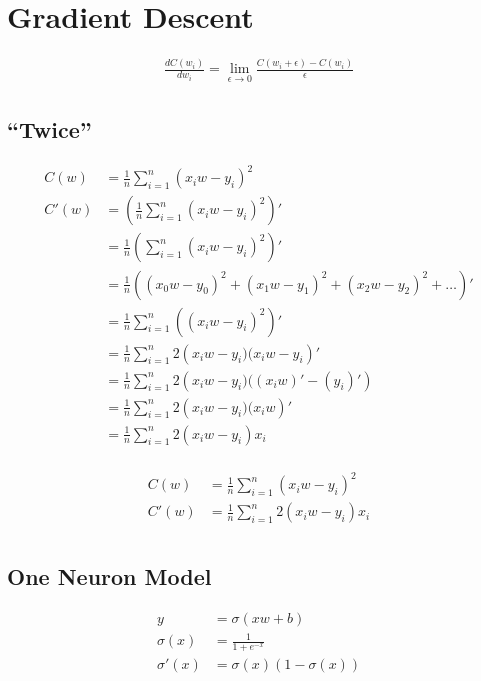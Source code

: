 \documentclass{article}
\begin{document}
\section{Gradient Descent}

\begin{align}
    \frac{dC(w_i)}{dw_i} = \lim_{\epsilon \to 0}\frac{C(w_i + \epsilon) - C(w_i)}{\epsilon}
\end{align}

\subsection{``Twice''}

\begin{align}
    C(w) &= \frac{1}{n} \sum_{i=1}^{n} (x_i w - y_i)^2 \\
    C'(w) 
	&= \left(\frac{1}{n} \sum_{i=1}^{n} (x_i w - y_i)^2\right)' \\
	&= \frac{1}{n}\left(\sum_{i=1}^{n} (x_i w - y_i)^2\right)' \\
	&= \frac{1}{n}\left((x_0 w - y_0)^2 + (x_1 w - y_1)^2 + (x_2 w - y_2)^2 + \hdots \right)' \\
	&= \frac{1}{n}\sum_{i=1}^{n} \left((x_i w - y_i)^2\right)' \\
	&= \frac{1}{n}\sum_{i=1}^{n} 2\left(x_i w - y_i) (x_i w - y_i\right)' \\
	&= \frac{1}{n}\sum_{i=1}^{n} 2\left(x_i w - y_i) ((x_i w)' - (y_i)'\right) \\
	&= \frac{1}{n}\sum_{i=1}^{n} 2\left(x_i w - y_i) (x_i w \right)' \\
	&= \frac{1}{n}\sum_{i=1}^{n} 2\left(x_i w - y_i\right)x_i \\
\end{align}

\begin{align}
	C(w) &= \frac{1}{n} \sum_{i=1}^{n} (x_i w - y_i)^2 \\
	C'(w) &= \frac{1}{n}\sum_{i=1}^{n} 2\left(x_i w - y_i\right)x_i \\
\end{align}

\subsection{One Neuron Model}

\begin{align}
	y &= \sigma(xw + b) \\
	\sigma(x) &= \frac{1}{1 + e^{-x}} \\
	\sigma'(x) &= \sigma(x) (1-\sigma(x)) \\
\end{align}
\end{document}
